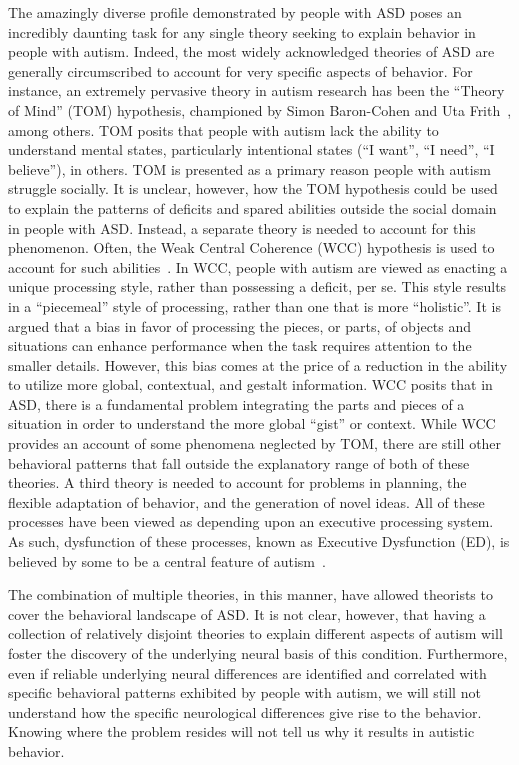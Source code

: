 \documentclass[man]{apa}
\begin{document}
The amazingly diverse profile demonstrated by people with ASD poses an incredibly daunting task for any single theory seeking to explain behavior in people with autism.  Indeed, the most widely acknowledged theories of ASD are generally circumscribed to account for very specific aspects of behavior.  For instance, an extremely pervasive theory in autism research has been the ``Theory of Mind'' (TOM) hypothesis, championed by Simon Baron-Cohen and Uta Frith~\cite{Baron-Cohen:1985:AutismTOM}, among others.  TOM posits that people with autism lack the ability to understand mental states, particularly intentional states (``I want'', ``I need'', ``I believe''), in others.  TOM is presented as a primary reason people with autism struggle socially. It is unclear, however, how the TOM hypothesis could be used to explain the patterns of deficits and spared abilities outside the social domain in people with ASD.  Instead, a separate theory is needed to account for this phenomenon. Often, the Weak Central Coherence (WCC) hypothesis is used to account for such abilities~\cite{RefWorks:37}.  In WCC, people with autism are viewed as enacting a unique processing style, rather than possessing a deficit, per se.  This style results in a ``piecemeal'' style of processing, rather than one that is more ``holistic''.  It is argued that a bias in favor of processing the pieces, or parts, of objects and situations can enhance performance when the task requires attention to the smaller details.  However, this bias comes at the price of a reduction in the ability to utilize more global, contextual, and gestalt information.  WCC posits that in ASD, there is a fundamental problem integrating the parts and pieces of a situation in order to understand the more global ``gist'' or context.  While WCC provides an account of some phenomena neglected by TOM, there are still other behavioral patterns that fall outside the explanatory range of both of these theories.  A third theory is needed to account for problems in planning, the flexible adaptation of behavior, and the generation of novel ideas.  All of these processes have been viewed as depending upon an executive processing system.  As such, dysfunction of these processes, known as Executive Dysfunction (ED), is believed by some to be a central feature of autism~\cite{HughesC:1994:AutismExecutiveDysfunction,HillEL:2004:AutismExecutiveDysfunction,Ozonoff:1991:AutismExecutiveDysfunction}.  

The combination of multiple theories, in this manner, have allowed theorists to cover the behavioral landscape of ASD.   It is not clear, however, that having a collection of relatively disjoint theories to explain different aspects of autism will foster the discovery of the underlying neural basis of this condition.  Furthermore, even if reliable underlying neural differences are identified and correlated with specific behavioral patterns exhibited by people with autism, we will still not understand how the specific neurological differences give rise to the behavior.  Knowing where the problem resides will not tell us why it results in autistic behavior.  
\end{document}
